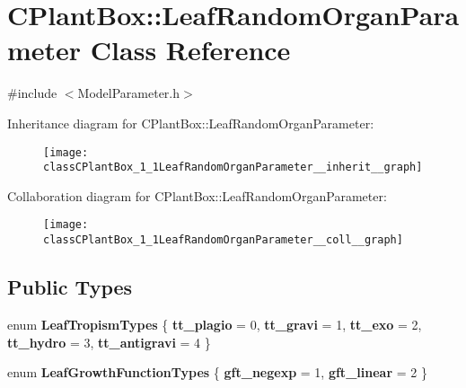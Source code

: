 \hypertarget{classCPlantBox_1_1LeafRandomOrganParameter}{}\section{C\+Plant\+Box\+:\+:Leaf\+Random\+Organ\+Parameter Class Reference}
\label{classCPlantBox_1_1LeafRandomOrganParameter}


{\ttfamily \#include $<$Model\+Parameter.\+h$>$}



Inheritance diagram for C\+Plant\+Box\+:\+:Leaf\+Random\+Organ\+Parameter\+:\nopagebreak
\begin{figure}[H]
\begin{center}
\leavevmode
\texttt{[image: classCPlantBox\_1\_1LeafRandomOrganParameter\_\_inherit\_\_graph]}
\end{center}
\end{figure}


Collaboration diagram for C\+Plant\+Box\+:\+:Leaf\+Random\+Organ\+Parameter\+:\nopagebreak
\begin{figure}[H]
\begin{center}
\leavevmode
\texttt{[image: classCPlantBox\_1\_1LeafRandomOrganParameter\_\_coll\_\_graph]}
\end{center}
\end{figure}
\subsection*{Public Types}
\begin{DoxyCompactItemize}
\item 
\mbox{\label{classCPlantBox_1_1LeafRandomOrganParameter_adee79852a22b74f67005bdd1dde99351}} 
enum {\bfseries Leaf\+Tropism\+Types} \{ \newline
{\bfseries tt\+\_\+plagio} = 0, 
{\bfseries tt\+\_\+gravi} = 1, 
{\bfseries tt\+\_\+exo} = 2, 
{\bfseries tt\+\_\+hydro} = 3, 
\newline
{\bfseries tt\+\_\+antigravi} = 4
 \}
\item 
\mbox{\label{classCPlantBox_1_1LeafRandomOrganParameter_acc5540fca1aeae1c93cb435658d29eff}} 
enum {\bfseries Leaf\+Growth\+Function\+Types} \{ {\bfseries gft\+\_\+negexp} = 1, 
{\bfseries gft\+\_\+linear} = 2
 \}
\end{DoxyCompactItemize}
